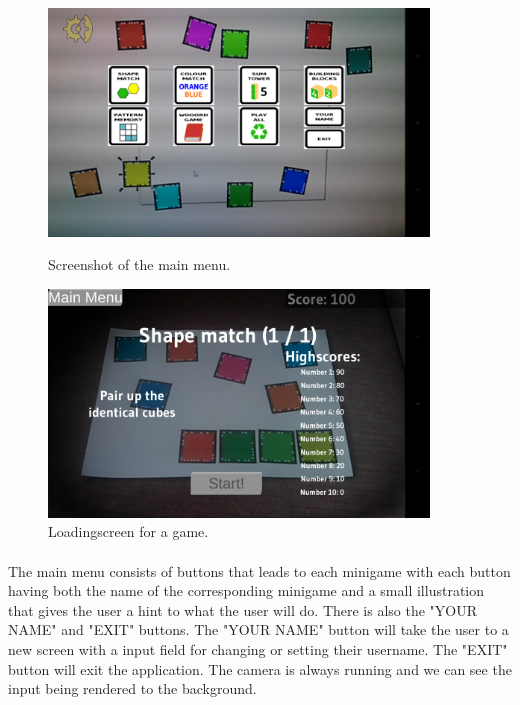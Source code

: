 
\begin{figure}[h]
	\centering
	\begin{minipage}{.5\textwidth}
		\capstart
		\centering
		\includegraphics[width=0.9\textwidth]{images/main_menu.png}
		\vspace{-10pt}
		\caption{Screenshot of the main menu.}
		\label{fig:main_menu}
	\end{minipage}%
	\begin{minipage}{.5\textwidth}
		\capstart
		\centering
		\includegraphics[width=0.9\textwidth]{images/loading_screen.png}
		\vspace{-10pt}
		\caption[Screenshot of a loading screen.]{Loadingscreen for a game.}
		\label{fig:loading_screen}
	\end{minipage}%
\end{figure}

\paragraph{}
The main menu consists of buttons that leads to each minigame with each button having both the name of the corresponding
minigame and a small illustration that gives the user a hint to what the user will do.
There is also the "YOUR NAME" and "EXIT" buttons. The "YOUR NAME" button will take the user to a new screen with a input field 
for changing or setting their username. The "EXIT" button will exit the application.
The camera is always running and we can see the input being rendered to the background.

